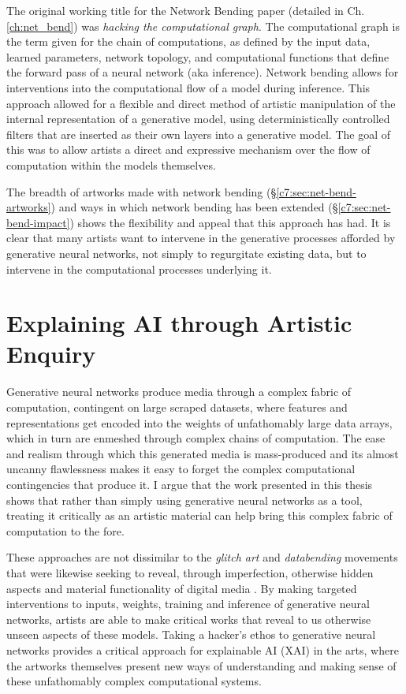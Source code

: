 The original working title for the Network Bending paper (detailed in Ch. \ref{ch:net_bend}) was \textit{hacking the computational graph}.
The computational graph is the term given for the chain of computations, as defined by the input data, learned parameters, network topology, and computational functions that define the forward pass of a neural network (aka inference). Network bending allows for interventions into the computational flow of a model during inference. 
This approach allowed for a flexible and direct method of artistic manipulation of the internal representation of a generative model, using deterministically controlled filters that are inserted as their own layers into a generative model.
The goal of this was to allow artists a direct and expressive mechanism over the flow of computation within the models themselves.

The breadth of artworks made with network bending (\S \ref{c7:sec:net-bend-artworks}) and ways in which network bending has been extended (\S \ref{c7:sec:net-bend-impact}) shows the flexibility and appeal that this approach has had.
It is clear that many artists want to intervene in the generative processes afforded by generative neural networks, not simply to regurgitate existing data, but to intervene in the computational processes underlying it.

\section{Explaining AI through Artistic Enquiry}
\label{c8:sec:explaining}

Generative neural networks produce media through a complex fabric of computation, contingent on large scraped datasets, where features and representations get encoded into the weights of unfathomably large data arrays, which in turn are enmeshed through complex chains of computation. 
The ease and realism through which this generated media is mass-produced and its almost uncanny flawlessness \citep{smith2023ai} makes it easy to forget the complex computational contingencies that produce it. 
I argue that the work presented in this thesis shows that rather than simply using generative neural networks as a tool, treating it critically as an artistic material can help bring this complex fabric of computation to the fore. 

These approaches are not dissimilar to the \textit{glitch art} and \textit{databending} movements that were likewise seeking to reveal, through imperfection, otherwise hidden aspects and material functionality of digital media \citep{kemper2023glitch}.
By making targeted interventions to inputs, weights, training and inference of generative neural networks, artists are able to make critical works that reveal to us otherwise unseen aspects of these models. 
Taking a hacker's ethos to generative neural networks provides a critical approach for explainable AI (XAI) in the arts,
where the artworks themselves present new ways of understanding and making sense of these unfathomably complex computational systems. 


